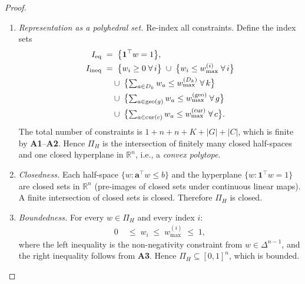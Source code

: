 \documentclass[12pt,openany]{book}
\newcommand{\R}{\mathbb{R}}
\newcommand{\bfw}{\mathbf{w}}
\newcommand{\calD}{\mathcal{D}}
\numberwithin{equation}{chapter}
\theoremstyle{plain}
\theoremstyle{definition}
\theoremstyle{remark}
\def\calD{D}%
\def\mathcal#1{#1}%
\def\bfw{w}%
\begin{document}
\begin{proof}
\begin{enumerate}
  \begin{enumerate}
    \item \textit{Representation as a polyhedral set.}
          Re-index all constraints.  Define the index sets
          \begin{align}
            \mathcal{I}_{\mathrm{eq}}
            &\;=\;
            \bigl\{\mathbf{1}^{\top}\bfw = 1\bigr\},
            \notag\\
            \mathcal{I}_{\mathrm{ineq}}
            &\;=\;
            \bigl\{w_i \geq 0 \;\forall\,i\bigr\}
            \;\cup\;
            \bigl\{w_i \leq w_{\max}^{(i)} \;\forall\,i\bigr\}
            \notag\\
            &\quad
            \;\cup\;
            \bigl\{
              \textstyle\sum_{a\in\calD_k} w_a
              \leq w_{\max}^{(\calD_k)} \;\forall\,k
            \bigr\}
            \notag\\
            &\quad
            \;\cup\;
            \bigl\{
              \textstyle\sum_{a\in\mathrm{geo}(g)} w_a
              \leq w_{\max}^{(\mathrm{geo})} \;\forall\,g
            \bigr\}
            \notag\\
            &\quad
            \;\cup\;
            \bigl\{
              \textstyle\sum_{a\in\mathrm{cur}(c)} w_a
              \leq w_{\max}^{(\mathrm{cur})} \;\forall\,c
            \bigr\}.
            \label{eq:ineq-index}
          \end{align}
          The total number of constraints is
          $1 + n + n + K + |\mathcal{G}| + |\mathcal{C}|$,
          which is finite by \textbf{A1}--\textbf{A2}.
          Hence $\Pi_H$ is the intersection of finitely many closed
          half-spaces and one closed hyperplane in $\R^n$, i.e., a
          \emph{convex polytope}.

    \item \textit{Closedness.}
          Each half-space $\{\bfw : \mathbf{a}^{\top}\bfw \leq b\}$
          and the hyperplane $\{\bfw : \mathbf{1}^{\top}\bfw = 1\}$
          are closed sets in $\R^n$ (pre-images of closed sets under
          continuous linear maps).  A finite intersection of closed
          sets is closed.  Therefore $\Pi_H$ is closed.

    \item \textit{Boundedness.}
          For every $\bfw \in \Pi_H$ and every index $i$:
          \begin{align}
            0
            &\;\leq\; w_i
            \;\leq\; w_{\max}^{(i)}
            \;\leq\; 1,
            \label{eq:bounded-coord}
          \end{align}
          where the left inequality is the non-negativity constraint
          from $\bfw \in \Delta^{n-1}$, and the right inequality
          follows from \textbf{A3}.  Hence
          $\Pi_H \subseteq [0,1]^n$, which is bounded.


\end{enumerate}
\end{enumerate}
\end{proof}
\end{document}

